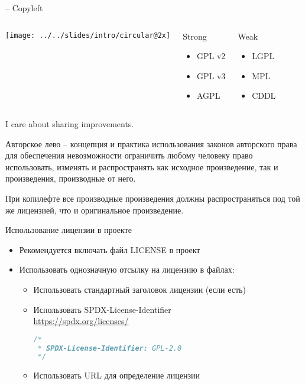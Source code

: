 \begin{frame}{\textcopyleft -- Copyleft}

	\begin{columns}
		\center\texttt{[image: ../../slides/intro/circular@2x]}


	\begin{block}{Strong}
	\begin{itemize}
		\item GPL v2
        \item GPL v3
		\item AGPL
	\end{itemize}
    \end{block}

	\begin{block}{Weak}
	\begin{itemize}
		\item LGPL
		\item MPL
		\item CDDL
	\end{itemize}
    \end{block}

	\end{columns}


	\begin{block}{I care about sharing improvements.}
	
	Авторское лево -- концепция и практика использования законов авторского права для обеспечения 
	невозможности ограничить любому человеку право использовать,  изменять и распространять как 
	исходное произведение,  так и произведения,  производные от него.
	\end{block}


	При копилефте все производные произведения должны распространяться под той же лицензией,
	что и оригинальное произведение.

\end{frame}

\begin{frame}[fragile]{Использование лицензии в проекте}
    \begin{itemize}
        \item Рекомендуется включать файл {\ttfamily LICENSE} в проект
        \item Использовать однозначную отсылку на лицензию в файлах:
            \begin{itemize}
                \item Использовать стандартный заголовок лицензии (если есть)
                \item Использовать SPDX-License-Identifier\\
                    \url{https://spdx.org/licenses/}
                    \begin{lstlisting}[language=C]
/*
 * SPDX-License-Identifier: GPL-2.0
 */
\end{lstlisting}
                \item Использовать URL для определение лицензии
            \end{itemize}
    \end{itemize}
\end{frame}

